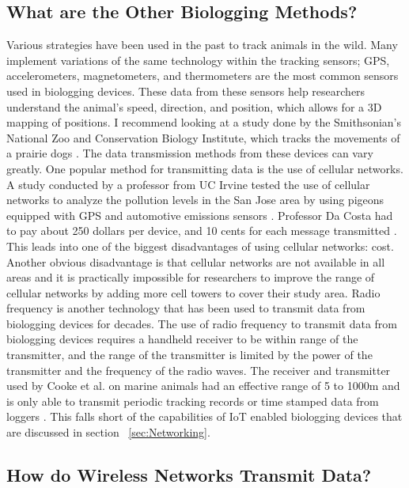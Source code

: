 \documentclass[sigplan,screen,nonacm]{acmart}
\begin{document}
\subsection{What are the Other Biologging Methods?}
\label{subsec:What are the Other Biologging Methods?}

Various strategies have been used in the past to track animals in the wild. Many
implement variations of the same technology within the tracking sensors;
GPS, accelerometers, magnetometers, and thermometers are the most common sensors used in
biologging devices. These data from these sensors help researchers understand
the animal's  speed, direction, and position, which allows for a 3D mapping of
positions\cite{Kidangoor_2024}. I recommend looking at a study done by the Smithsonian's National Zoo and Conservation Biology Institute, which
tracks the movements of a prairie dogs \cite{Kidangoor_2024}.
The data transmission methods from these devices can vary greatly. One popular 
method for transmitting data is the use of cellular networks.
A study conducted by a professor from UC Irvine tested the use of cellular
networks to analyze the pollution levels in the San Jose area by using pigeons
equipped with GPS and automotive emissions sensors \cite{Martin_2006}. Professor
Da Costa had to pay about 250 dollars per device, and 10 cents for each message transmitted \cite{Martin_2006}. 
This leads into one of the biggest
disadvantages of using cellular networks: cost. Another obvious disadvantage
is that cellular networks are not available in all areas and it is practically impossible for researchers
to improve the range of cellular networks by adding more cell towers to cover
their study area. Radio frequency is another technology that has been used to
transmit data from biologging devices for decades. The use of radio frequency
to transmit data from biologging devices requires a handheld receiver to be within range
of the transmitter, and the range of the transmitter is limited by the power of
the transmitter and the frequency of the radio waves. The receiver and transmitter
used by Cooke et al. on marine animals had an effective range of 5 to 1000m and 
is only able to transmit periodic tracking records or time stamped data from loggers
\cite{cooke2012biotelemetry}. This falls short of the capabilities of IoT enabled 
biologging devices that are discussed in section ~\ref{sec:Networking}. 

\subsection{How do Wireless Networks Transmit Data?}
\label{subsec:How do Wireless Networks Transmit Data?}
\end{document}
